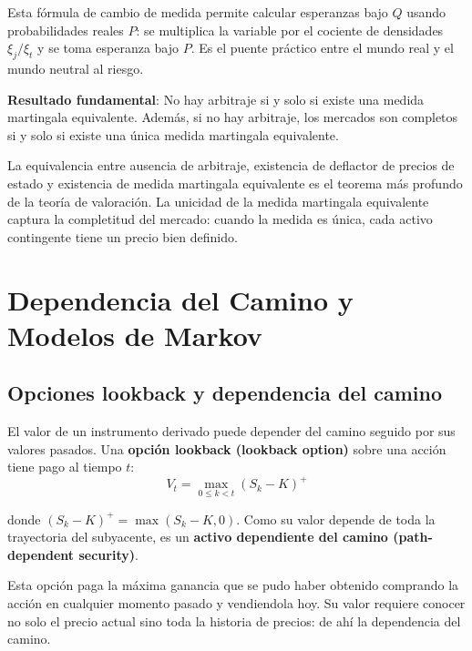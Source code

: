 \documentclass[12pt]{article}
\begin{document}
\begin{intuicionmat}
Esta f\'ormula de cambio de medida permite calcular esperanzas bajo $Q$ usando probabilidades reales $P$: se multiplica la variable por el cociente de densidades $\xi_j/\xi_t$ y se toma esperanza bajo $P$. Es el puente pr\'actico entre el mundo real y el mundo neutral al riesgo.
\end{intuicionmat}

\textbf{Resultado fundamental}: No hay arbitraje si y solo si existe una medida martingala equivalente. Adem\'as, si no hay arbitraje, los mercados son completos si y solo si existe una \'unica medida martingala equivalente.

\begin{intuicion}
La equivalencia entre ausencia de arbitraje, existencia de deflactor de precios de estado y existencia de medida martingala equivalente es el teorema m\'as profundo de la teor\'ia de valoraci\'on. La unicidad de la medida martingala equivalente captura la completitud del mercado: cuando la medida es \'unica, cada activo contingente tiene un precio bien definido.
\end{intuicion}

\section{Dependencia del Camino y Modelos de Markov}

\subsection{Opciones lookback y dependencia del camino}

El valor de un instrumento derivado puede depender del camino seguido por sus valores pasados. Una \textbf{opci\'on lookback (lookback option)} sobre una acci\'on tiene pago al tiempo $t$:
\begin{equation}
    V_t = \max_{0 \leq k < t}(S_k - K)^+
\end{equation}

donde $(S_k - K)^+ = \max(S_k - K, 0)$. Como su valor depende de toda la trayectoria del subyacente, es un \textbf{activo dependiente del camino (path-dependent security)}.

\begin{intuicionmat}
Esta opci\'on paga la m\'axima ganancia que se pudo haber obtenido comprando la acci\'on en cualquier momento pasado y vendiendola hoy. Su valor requiere conocer no solo el precio actual sino toda la historia de precios: de ah\'i la dependencia del camino.
\end{intuicionmat}
\end{document}
